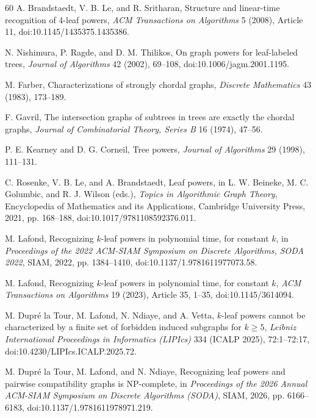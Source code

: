 \documentclass[11pt]{article}
\theoremstyle{definition}
\begin{document}
\begin{thebibliography}{60}
A. Brandstaedt, V. B. Le, and R. Sritharan,
Structure and linear-time recognition of 4-leaf powers,
\emph{ACM Transactions on Algorithms} 5 (2008), Article 11,
doi:10.1145/1435375.1435386.

N. Nishimura, P. Ragde, and D. M. Thilikos,
On graph powers for leaf-labeled trees,
\emph{Journal of Algorithms} 42 (2002), 69--108,
doi:10.1006/jagm.2001.1195.

M. Farber,
Characterizations of strongly chordal graphs,
\emph{Discrete Mathematics} 43 (1983), 173--189.

F. Gavril,
The intersection graphs of subtrees in trees are exactly the chordal graphs,
\emph{Journal of Combinatorial Theory, Series B} 16 (1974), 47--56.

P. E. Kearney and D. G. Corneil,
Tree powers,
\emph{Journal of Algorithms} 29 (1998), 111--131.

C. Rosenke, V. B. Le, and A. Brandstaedt,
Leaf powers,
in L. W. Beineke, M. C. Golumbic, and R. J. Wilson (eds.), \emph{Topics in Algorithmic Graph Theory},
Encyclopedia of Mathematics and its Applications, Cambridge University Press, 2021, pp. 168--188,
doi:10.1017/9781108592376.011.

M. Lafond,
Recognizing $k$-leaf powers in polynomial time, for constant $k$,
in \emph{Proceedings of the 2022 ACM-SIAM Symposium on Discrete Algorithms, SODA 2022},
SIAM, 2022, pp. 1384--1410,
doi:10.1137/1.9781611977073.58.

M. Lafond,
Recognizing $k$-leaf powers in polynomial time, for constant $k$,
\emph{ACM Transactions on Algorithms} 19 (2023), Article 35, 1--35,
doi:10.1145/3614094.

M. Dupr\'e la Tour, M. Lafond, N. Ndiaye, and A. Vetta,
$k$-leaf powers cannot be characterized by a finite set of forbidden induced subgraphs for $k\ge 5$,
\emph{Leibniz International Proceedings in Informatics (LIPIcs)} 334 (ICALP 2025), 72:1--72:17,
doi:10.4230/LIPIcs.ICALP.2025.72.

M. Dupr\'e la Tour, M. Lafond, and N. Ndiaye,
Recognizing leaf powers and pairwise compatibility graphs is NP-complete,
in \emph{Proceedings of the 2026 Annual ACM-SIAM Symposium on Discrete Algorithms (SODA)}, SIAM, 2026, pp. 6166--6183,
doi:10.1137/1.9781611978971.219.



\end{thebibliography}
\end{document}
